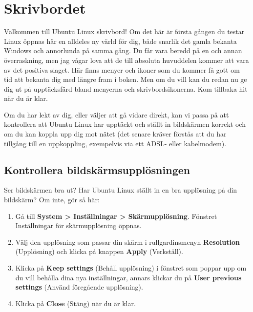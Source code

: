 \documentclass[a4paper,final]{memoir} %
\begin{document}
\section{Skrivbordet}


Välkommen till Ubuntu Linux skrivbord! Om det här är första gången du testar Linux öppnas här en alldeles ny värld för dig, både snarlik det gamla bekanta Windows och annorlunda på samma gång. Du får vara beredd på en och annan överraskning, men jag vågar lova att de till absoluta huvuddelen kommer att vara av det positiva slaget. Här finns menyer och ikoner som du kommer få gott om tid att bekanta dig med längre fram i boken. Men om du vill kan du redan nu ge dig ut på upptäcksfärd bland menyerna och skrivbordsikonerna. Kom tillbaka hit när du är klar.


Om du har lekt av dig, eller väljer att gå vidare direkt, kan vi passa på att kontrollera att Ubuntu Linux har upptäckt och ställt in bildskärmen korrekt och om du kan koppla upp dig mot nätet (det senare kräver förstås att du har tillgång till en uppkoppling, exempelvis via ett ADSL- eller kabelmodem).



\subsection{Kontrollera bildskärmsupplösningen}


Ser bildskärmen bra ut? Har Ubuntu Linux ställt in en bra upplösning på din bildskärm? Om inte, gör så här:

\begin{enumerate}

\item Gå till \textbf{System \textgreater{} Inställningar \textgreater{} Skärmupplösning}. Fönstret Inställningar för skärmupplösning öppnas.
\item Välj den upplösning som passar din skärm i rullgardinsmenyn \textbf{Resolution} (Upplösning) och klicka på knappen \textbf{Apply} (Verkställ). 
\item Klicka på \textbf{Keep settings} (Behåll upplösning) i fönstret som poppar upp om du vill behålla dina nya inställningar, annars klickar du på \textbf{User previous settings} (Använd föregående upplösning).
\item Klicka på \textbf{Close} (Stäng) när du är klar.

\end{enumerate}
\end{document}
